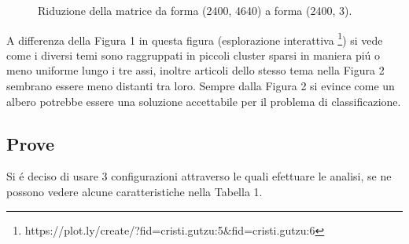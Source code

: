 \documentclass[runningheads]{llncs}
\begin{document}
\begin{figure}%
    \centering
    \qquad
    \caption{Riduzione della matrice da forma (2400, 4640) a forma (2400, 3). }%
    \label{fig:tsne2}%
\end{figure}


A differenza della Figura 1 in questa figura (esplorazione interattiva
\footnote{https://plot.ly/create/?fid=cristi.gutzu:5\&fid=cristi.gutzu:6}) si vede come i diversi temi sono raggruppati in piccoli cluster sparsi in maniera pi\'u o meno uniforme lungo i tre assi, inoltre articoli dello stesso tema nella Figura 2 sembrano essere meno distanti tra loro. Sempre dalla Figura 2 si evince come un albero potrebbe essere una soluzione accettabile per il problema di classificazione.

\subsection{Prove}

Si \'e deciso di usare 3 configurazioni attraverso le quali efettuare le analisi, se ne possono vedere alcune caratteristiche nella Tabella 1.
\end{document}
